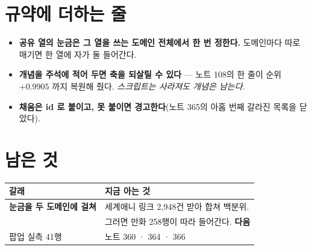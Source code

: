 \documentclass[11pt]{article}
\begin{document}
\section{규약에 더하는 줄}

\begin{itemize}
\item \textbf{공유 열의 눈금은 그 열을 쓰는 도메인 전체에서 한 번 정한다.}
도메인마다 따로 매기면 한 열에 자가 둘 들어간다.
\item \textbf{개념을 주석에 적어 두면 축을 되살릴 수 있다} --- 노트 108의
한 줄이 순위 $+0.9905$ 까지 복원해 줬다. \emph{스크립트는 사라져도 개념은
남는다.}
\item \textbf{채움은 id 로 붙이고, 못 붙이면 경고한다}(노트 365의 아홉 번째
갈라진 목록을 닫았다).
\end{itemize}

\section{남은 것}

\begin{center}
\begin{tabular}{ll}
\hline
갈래 & 지금 아는 것 \\
\hline
\textbf{눈금을 두 도메인에 걸쳐} & 세계애니 링크 2,948건 받아 합쳐 백분위. \\
 & 그러면 만화 258행이 따라 들어간다. \textbf{다음} \\
팝업 실측 41행 & 노트 360 · 364 · 366 \\
\hline
\end{tabular}
\end{center}
\end{document}
